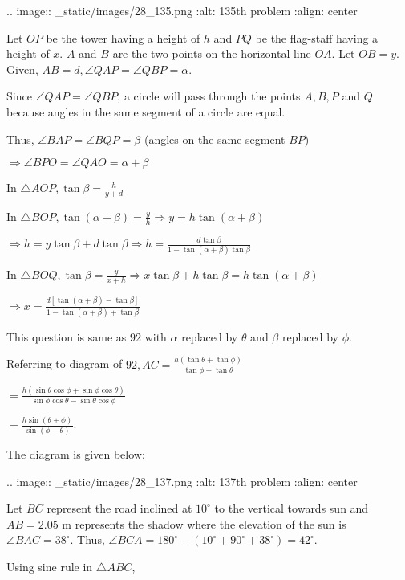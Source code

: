   .. image:: _static/images/28_135.png
  :alt: 135th problem
  :align: center

  Let $OP$ be the tower having a height of $h$ and $PQ$ be the flag-staff having a
  height of $x$. $A$ and $B$ are the two points on the horizontal line $OA$. Let
  $OB = y$. Given, $AB = d, \angle QAP = \angle QBP = \alpha$.

  Since $\angle QAP = \angle QBP$, a circle will pass through the points $A, B, P$ and
  $Q$ because angles in the same segment of a circle are equal.

  Thus, $\angle BAP = \angle BQP = \beta$ (angles on the same segment $BP$)

  $\Rightarrow \angle BPO = \angle QAO = \alpha + \beta$

  In $\triangle AOP, \tan\beta = \frac{h}{y + d}$

  In $\triangle BOP, \tan(\alpha + \beta) = \frac{y}{h} \Rightarrow y = h\tan(\alpha + \beta)$

  $\Rightarrow h = y\tan\beta + d\tan\beta\Rightarrow h = \frac{d\tan\beta}{1 - \tan(\alpha +
    \beta)\tan\beta}$

  In $\triangle BOQ, \tan\beta = \frac{y}{x + h}\Rightarrow x\tan\beta + h\tan\beta =
  h\tan(\alpha + \beta)$

  $\Rightarrow x = \frac{d[\tan(\alpha + \beta) - \tan\beta]}{1 - \tan(\alpha + \beta) + \tan\beta}$

\item This question is same as $92$ with $\alpha$ replaced by $\theta$ and $\beta$
  replaced by $\phi$.

  Referring to diagram of $92, AC = \frac{h(\tan\theta + \tan\phi)}{\tan\phi - \tan\theta}$

  $= \frac{h(\sin\theta\cos\phi + \sin\phi\cos\theta)}{\sin\phi\cos\theta - \sin\theta\cos\phi}$

  $= \frac{h\sin(\theta + \phi)}{\sin(\phi - \theta)}$.

\item The diagram is given below:

  .. image:: _static/images/28_137.png
  :alt: 137th problem
  :align: center

  Let $BC$ represent the road inclined at $10^\circ$ to the vertical towards sun and
  $AB = 2.05$ m represents the shadow where the elevation of the sun is $\angle BAC =
  38^\circ$. Thus, $\angle BCA = 180^\circ - (10^\circ + 90^\circ + 38^\circ) = 42^\circ$.

  Using sine rule in $\triangle ABC$,

